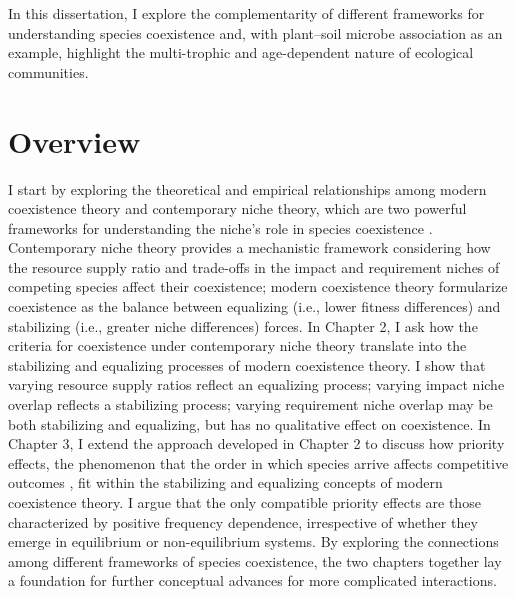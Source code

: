 In this dissertation, I explore the complementarity of different frameworks for understanding species coexistence and, with plant--soil microbe association as an example, highlight the multi-trophic and age-dependent nature of ecological communities. 
\par



\section{Overview}
I start by exploring the theoretical and empirical relationships among modern coexistence theory and contemporary niche theory, which are two powerful frameworks for understanding the niche's role in species coexistence \citep{Chesson2000, Chase2003}. Contemporary niche theory provides a mechanistic framework considering how the resource supply ratio and trade-offs in the impact and requirement niches of competing species affect their coexistence; modern coexistence theory formularize coexistence as the balance between equalizing (i.e., lower fitness differences) and stabilizing (i.e., greater niche differences) forces. In Chapter 2, I ask how the criteria for coexistence under contemporary niche theory translate into the stabilizing and equalizing processes of modern coexistence theory. I show that varying resource supply ratios reflect an equalizing process; varying impact niche overlap reflects a stabilizing process; varying requirement niche overlap may be both stabilizing and equalizing, but has no qualitative effect on coexistence.
In Chapter 3, I extend the approach developed in Chapter 2 to discuss how priority effects, the phenomenon that the order in which species arrive affects competitive outcomes \citep{Fukami2015}, fit within the stabilizing and equalizing concepts of modern coexistence theory. I argue that the only compatible priority effects are those characterized by positive frequency dependence, irrespective of whether they emerge in equilibrium or non-equilibrium systems.
By exploring the connections among different frameworks of species coexistence, the two chapters together lay a foundation for further conceptual advances for more complicated interactions.
\par



